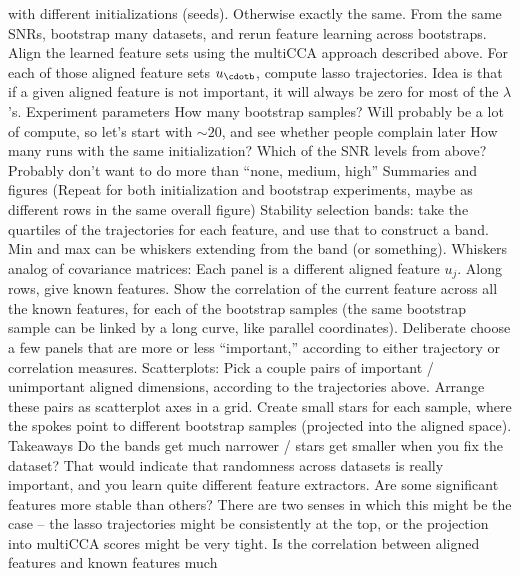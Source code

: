 \documentclass[11pt]{article}
\begin{document}
\begin{outline}
        with different initializations (seeds). Otherwise exactly the same.
        \4 From the same SNRs, bootstrap many datasets, and rerun feature
        learning across bootstraps.
        \4 Align the learned feature sets using the multiCCA approach described
        above. For each of those aligned feature sets $u_{\cdotb}$, compute
        lasso trajectories. Idea is that if a given aligned feature is not
        important, it will always be zero for most of the $\lambda$'s.
      \3 Experiment parameters
        \4 How many bootstrap samples? Will probably be a lot of compute, so
        let's start with $\sim 20$, and see whether people complain later
        \4 How many runs with the same initialization?
        \4 Which of the SNR levels from above? Probably don't want to do more
        than ``none, medium, high''
      \3 Summaries and figures
        \4 (Repeat for both initialization and bootstrap experiments, maybe as
        different rows in the same overall figure)
        \4 Stability selection bands: take the quartiles of the trajectories for
        each feature, and use that to construct a band. Min and max can be
        whiskers extending from the band (or something).
        \4 Whiskers analog of covariance matrices: Each panel is a different
        aligned feature $u_{j}$. Along rows, give known features. Show the
        correlation of the current feature across all the known features, for
        each of the bootstrap samples (the same bootstrap sample can be linked
        by a long curve, like parallel coordinates). Deliberate choose a few
        panels that are more or less ``important,'' according to either
        trajectory or correlation measures.
        \4 Scatterplots: Pick a couple pairs of important / unimportant aligned
        dimensions, according to the trajectories above. Arrange these pairs as
        scatterplot axes in a grid. Create small stars for each sample, where
        the spokes point to different bootstrap samples (projected into the
        aligned space).
      \3 Takeaways
        \4 Do the bands get much narrower / stars get smaller when you fix the
        dataset? That would indicate that randomness across datasets is really
        important, and you learn quite different feature extractors.
        \4 Are some significant features more stable than others? There are two
        senses in which this might be the case -- the lasso trajectories might
        be consistently at the top, or the projection into multiCCA scores might
        be very tight.
        \4 Is the correlation between aligned features and known features much

\end{outline}
\end{document}
